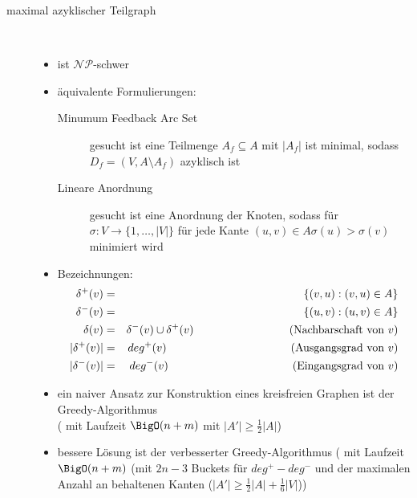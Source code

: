 \begin{description}
	\item[maximal azyklischer Teilgraph] \ \\\vspace*{-\baselineskip}
		\begin{itemize}
			\item ist $\mathcal{NP}$-schwer
			\item äquivalente Formulierungen:
				\begin{description}
					\item[Minumum Feedback Arc Set] gesucht ist eine Teilmenge $A_f\subseteq A$ mit $|A_f|$ ist minimal, sodass $D_f=(V,A\setminus A_f)$ azyklisch ist
					\item[Lineare Anordnung] gesucht ist eine Anordnung der Knoten, sodass für $\sigma : V\rightarrow \{1,\dots,|V|\}$ für jede Kante $(u,v)\in A \sigma(u)>\sigma(v)$ minimiert wird\\
					
				\end{description}
			\item Bezeichnungen:
				\begin{eqnarray*}
					\delta^{+}(v)&=&\{(v,u) : (v,u)\in A\}\\
					\delta^{-}(v)&=&\{(u,v) : (u,v)\in A\}\\
					\delta(v)&=&\delta^{-}(v)\cup \delta^{+}(v)\hspace*{3cm}\text{(Nachbarschaft von $v$)}\\
					|\delta^{+}(v)| &=& deg^{+}(v)\hspace*{3.9cm}\text{(Ausgangsgrad von $v$)}\\
					|\delta^{-}(v)| &=& deg^{-}(v)\hspace*{3.9cm}\text{(Eingangsgrad von $v$)}\\
				\end{eqnarray*}
				\vspace*{-\baselineskip}
			\item ein naiver Ansatz zur Konstruktion eines kreisfreien Graphen ist der Greedy-Algorithmus\\ (\algobreak{} mit Laufzeit $\BigO(n+m)$ mit $|A'|\geq \frac{1}{2}|A|$)
			\item bessere Lösung ist der verbesserter Greedy-Algorithmus ( mit Laufzeit $\BigO(n+m)$ (mit $2n-3$ Buckets für $deg^{+}-deg^{-}$ und der maximalen Anzahl an behaltenen Kanten ($|A'|\geq \frac{1}{2}|A|+\frac{1}{6}|V|$))
		\end{itemize}
\end{description}